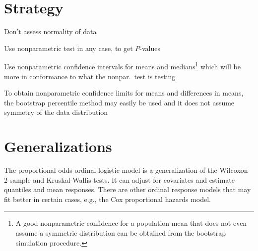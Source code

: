 \section{Strategy}
\bi
\item Don't assess normality of data
\item Use nonparametric test in any case, to get $P$-values
\item Use nonparametric confidence intervals for means and
  medians\footnote{A good nonparametric confidence for a population
    mean that does not even assume a symmetric distribution can be
    obtained from the bootstrap simulation procedure.}
  which will be more in conformance to what the nonpar.\ test is
  testing
\item To obtain nonparametric confidence limits for means and
  differences in means, the bootstrap percentile method may easily be
  used and it does not assume symmetry of the data distribution
\ei

\section{Generalizations}
The proportional odds ordinal logistic model is a generalization of
the Wilcoxon 2-sample and Kruskal-Wallis tests.  It can adjust for
covariates and estimate quantiles and mean responses.  There are other
ordinal response models that may fit better in certain cases, e.g.,
the Cox proportional hazards model.
